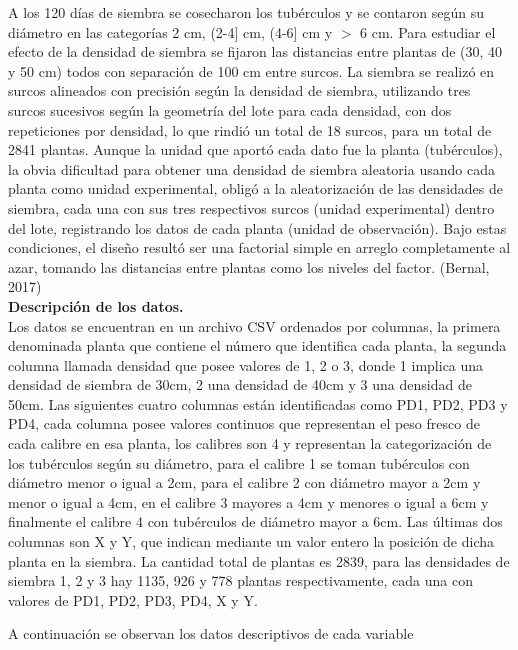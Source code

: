A los 120 días de siembra se cosecharon los tubérculos y se contaron según su diámetro en las categorías 2 cm, (2-4] cm, (4-6] cm y $>$ 6 cm. Para estudiar el efecto de la densidad de siembra se fijaron las distancias entre plantas de (30, 40 y 50 cm) todos con separación de 100 cm entre surcos. La siembra se realizó en surcos alineados con precisión según la densidad de siembra, utilizando tres surcos sucesivos según la geometría del lote para cada densidad, con dos repeticiones por densidad, lo que rindió un total de 18 surcos, para un total de 2841 plantas. Aunque la unidad que aportó cada dato fue la planta (tubérculos), la obvia dificultad para obtener una densidad de siembra aleatoria usando cada planta como unidad experimental, obligó a la aleatorización de las densidades de siembra, cada una con sus tres respectivos surcos (unidad experimental) dentro del lote, registrando los datos de cada planta (unidad de observación). Bajo estas condiciones, el diseño resultó ser una factorial simple en arreglo completamente al azar, tomando las distancias entre plantas como los niveles del factor. (Bernal, 2017)\\

\noindent
\textbf{Descripción de los datos.}\\

Los datos se encuentran en un archivo CSV ordenados por columnas, la primera denominada planta que contiene el número que identifica cada planta, la segunda columna llamada densidad que posee valores de 1, 2 o 3, donde 1 implica una densidad de siembra de 30cm, 2 una densidad de 40cm y 3 una densidad de 50cm. Las siguientes cuatro columnas están identificadas como PD1, PD2, PD3 y PD4, cada columna posee valores continuos que representan el peso fresco de cada calibre en esa planta, los calibres son 4 y representan la categorización de los tubérculos según su diámetro, para el calibre 1 se toman tubérculos con diámetro menor o igual a 2cm, para el calibre 2 con diámetro mayor a 2cm y menor o igual a 4cm, en el calibre 3 mayores a 4cm y menores o igual a 6cm y finalmente el calibre 4 con tubérculos de diámetro mayor a 6cm. Las últimas dos columnas son X y Y, que indican mediante un valor entero la posición de dicha planta en la siembra. La cantidad total de plantas es 2839, para las densidades de siembra 1, 2 y 3 hay 1135, 926 y 778 plantas respectivamente, cada una con valores de PD1, PD2, PD3, PD4, X y Y.

A continuación se observan los datos descriptivos de cada variable

